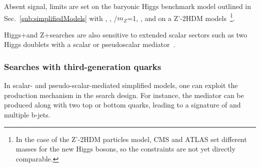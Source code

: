 Absent signal, limits are set on the baryonic Higgs benchmark model outlined in Sec.~\ref{sub:simplifiedModels} with  , , \ghZprimeZprime/$m_{Z}$=1, , 
and on a Z'-2HDM models~\footnote{ In the case of the Z'-2HDM particles model, CMS and ATLAS set different masses for the new Higgs bosons, 
so the constraints are not yet directly comparable.}.

Higgs+\MET and Z+\MET searches are also sensitive to extended scalar sectors such as two Higgs doublets with a scalar or pseudoscalar mediator~\cite{Bauer:2017ota,Ipek:2014gua,No:2015xqa,Goncalves:2016iyg,Bell:2016ekl}.


\subsubsection{Searches with third-generation quarks}


In scalar- and pseudo-scalar-mediated simplified models, one can exploit the production mechanism in the search design. For instance, the mediator can be produced along with two top or bottom quarks, leading to a signature of \MET and multiple b-jets.

